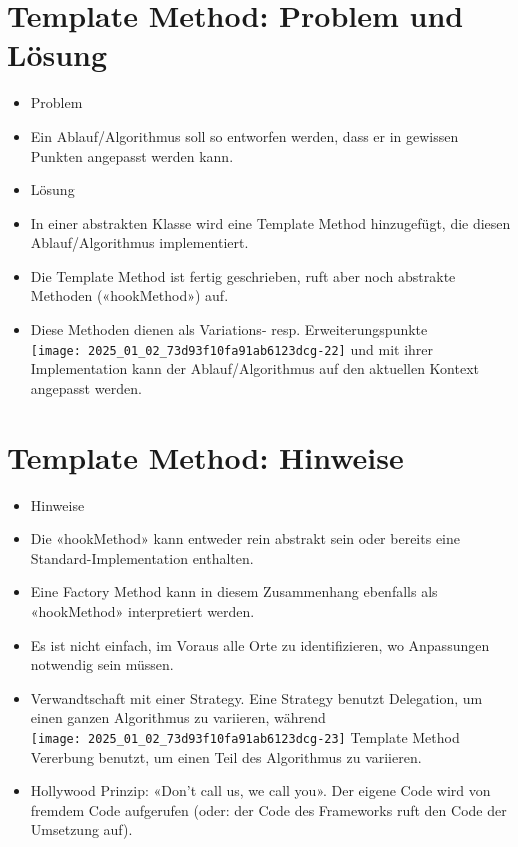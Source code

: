 \section*{Template Method: Problem und Lösung}
\begin{itemize}
  \item Problem
  \item Ein Ablauf/Algorithmus soll so entworfen werden, dass er in gewissen Punkten angepasst werden kann.
  \item Lösung
  \item In einer abstrakten Klasse wird eine Template Method hinzugefügt, die diesen Ablauf/Algorithmus implementiert.
  \item Die Template Method ist fertig geschrieben, ruft aber noch abstrakte Methoden («hookMethod») auf.
  \item Diese Methoden dienen als Variations- resp. Erweiterungspunkte\\
\texttt{[image: 2025\_01\_02\_73d93f10fa91ab6123dcg-22]} und mit ihrer Implementation kann der Ablauf/Algorithmus auf den aktuellen Kontext angepasst werden.
\end{itemize}

\section*{Template Method: Hinweise}
\begin{itemize}
  \item Hinweise
  \item Die «hookMethod» kann entweder rein abstrakt sein oder bereits eine Standard-Implementation enthalten.
  \item Eine Factory Method kann in diesem Zusammenhang ebenfalls als «hookMethod» interpretiert werden.
  \item Es ist nicht einfach, im Voraus alle Orte zu identifizieren, wo Anpassungen notwendig sein müssen.
  \item Verwandtschaft mit einer Strategy. Eine Strategy benutzt Delegation, um einen ganzen Algorithmus zu variieren, während\\
\texttt{[image: 2025\_01\_02\_73d93f10fa91ab6123dcg-23]} Template Method Vererbung benutzt, um einen Teil des Algorithmus zu variieren.
  \item Hollywood Prinzip: «Don’t call us, we call you». Der eigene Code wird von fremdem Code aufgerufen (oder: der Code des Frameworks ruft den Code der Umsetzung auf).
\end{itemize}

